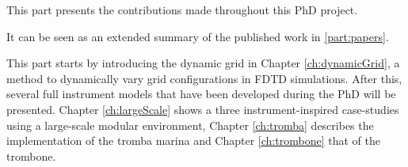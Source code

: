 This part presents the contributions made throughout this PhD project.

It can be seen as an extended summary of the published work in \ref{part:papers}.

This part starts by introducing the dynamic grid in Chapter \ref{ch:dynamicGrid}, a method to dynamically vary grid configurations in FDTD simulations. After this, several full instrument models that have been developed during the PhD will be presented. Chapter \ref{ch:largeScale} shows a three instrument-inspired case-studies using a large-scale modular environment, Chapter \ref{ch:tromba} describes the implementation of the tromba marina and Chapter \ref{ch:trombone} that of the trombone.